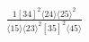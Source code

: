 \documentclass[varwidth, border=5pt]{standalone}
\begin{document}
\begin{my}
$\begin{gathered}
\scriptscriptstyle\frac{1[34]^2⟨24⟩⟨25⟩^2}{⟨15⟩⟨23⟩^2[35]^2⟨45⟩}
\end{gathered}$
\end{my}
\end{document}
